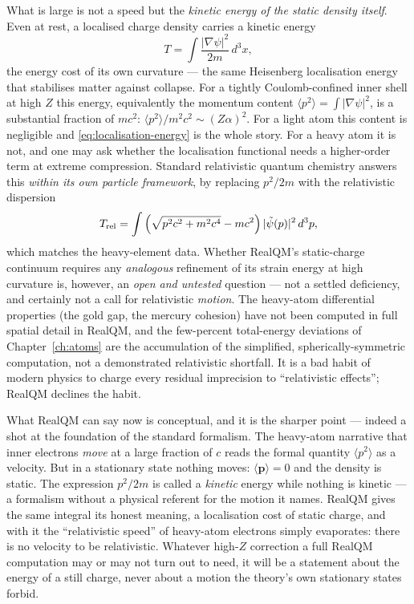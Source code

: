 What is large is not a speed but the \emph{kinetic energy of the static density itself}. Even at rest, a
localised charge density carries a kinetic energy
\begin{equation}
T=\int \frac{|\nabla\psi|^2}{2m}\,d^3x,
\label{eq:localisation-energy}
\end{equation}
the energy cost of its own curvature --- the same Heisenberg localisation energy that stabilises matter against
collapse. For a tightly Coulomb-confined inner shell at high $Z$ this energy, equivalently the momentum content
$\langle p^2\rangle=\int|\nabla\psi|^2$, is a substantial fraction of $m c^2$: $\langle p^2\rangle/m^2c^2\sim
(Z\alpha)^2$. For a light atom this content is negligible and \eqref{eq:localisation-energy} is the whole story. For a heavy
atom it is not, and one may ask whether the localisation functional needs a higher-order term at extreme
compression. Standard relativistic quantum chemistry answers this \emph{within its own particle framework}, by
replacing $p^2/2m$ with the relativistic dispersion
\begin{equation}
T_{\rm rel}=\int\Big(\sqrt{p^2c^2+m^2c^4}-mc^2\Big)\,|\tilde\psi(p)|^2\,d^3p,
\label{eq:relativistic-kinetic}
\end{equation}
which matches the heavy-element data. Whether RealQM's static-charge continuum requires any \emph{analogous}
refinement of its strain energy at high curvature is, however, an \emph{open and untested} question --- not a
settled deficiency, and certainly not a call for relativistic \emph{motion}. The heavy-atom differential
properties (the gold gap, the mercury cohesion) have not been computed in full spatial detail in RealQM, and the
few-percent total-energy deviations of Chapter~\ref{ch:atoms} are the accumulation of the simplified,
spherically-symmetric computation, not a demonstrated relativistic shortfall. It is a bad habit of modern physics
to charge every residual imprecision to ``relativistic effects''; RealQM declines the habit.

What RealQM can say now is conceptual, and it is the sharper point --- indeed a shot at the foundation of the
standard formalism. The heavy-atom narrative that inner electrons \emph{move} at a large fraction of $c$ reads the
formal quantity $\langle p^2\rangle$ as a velocity. But in a stationary state nothing moves:
$\langle\mathbf p\rangle=0$ and the density is static. The expression $p^2/2m$ is called a \emph{kinetic} energy
while nothing is kinetic --- a formalism without a physical referent for the motion it names. RealQM gives the
same integral its honest meaning, a localisation cost of static charge, and with it the ``relativistic speed'' of
heavy-atom electrons simply evaporates: there is no velocity to be relativistic. Whatever high-$Z$ correction a
full RealQM computation may or may not turn out to need, it will be a statement about the energy of a still
charge, never about a motion the theory's own stationary states forbid.

